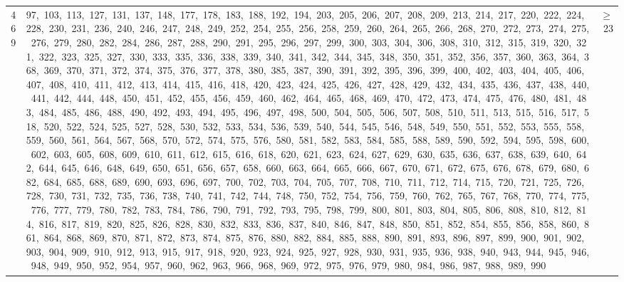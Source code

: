 \begin{longtable}{c|p{}|r}
469 & 97,\ 103,\ 113,\ 127,\ 131,\ 137,\ 148,\ 177,\ 178,\ 183,\ 188,\ 192,\ 194,\ 203,\ 205,\ 206,\ 207,\ 208,\ 209,\ 213,\ 214,\ 217,\ 220,\ 222,\ 224,\ 228,\ 230,\ 231,\ 236,\ 240,\ 246,\ 247,\ 248,\ 249,\ 252,\ 254,\ 255,\ 256,\ 258,\ 259,\ 260,\ 264,\ 265,\ 266,\ 268,\ 270,\ 272,\ 273,\ 274,\ 275,\ 276,\ 279,\ 280,\ 282,\ 284,\ 286,\ 287,\ 288,\ 290,\ 291,\ 295,\ 296,\ 297,\ 299,\ 300,\ 303,\ 304,\ 306,\ 308,\ 310,\ 312,\ 315,\ 319,\ 320,\ 321,\ 322,\ 323,\ 325,\ 327,\ 330,\ 333,\ 335,\ 336,\ 338,\ 339,\ 340,\ 341,\ 342,\ 344,\ 345,\ 348,\ 350,\ 351,\ 352,\ 356,\ 357,\ 360,\ 363,\ 364,\ 368,\ 369,\ 370,\ 371,\ 372,\ 374,\ 375,\ 376,\ 377,\ 378,\ 380,\ 385,\ 387,\ 390,\ 391,\ 392,\ 395,\ 396,\ 399,\ 400,\ 402,\ 403,\ 404,\ 405,\ 406,\ 407,\ 408,\ 410,\ 411,\ 412,\ 413,\ 414,\ 415,\ 416,\ 418,\ 420,\ 423,\ 424,\ 425,\ 426,\ 427,\ 428,\ 429,\ 432,\ 434,\ 435,\ 436,\ 437,\ 438,\ 440,\ 441,\ 442,\ 444,\ 448,\ 450,\ 451,\ 452,\ 455,\ 456,\ 459,\ 460,\ 462,\ 464,\ 465,\ 468,\ 469,\ 470,\ 472,\ 473,\ 474,\ 475,\ 476,\ 480,\ 481,\ 483,\ 484,\ 485,\ 486,\ 488,\ 490,\ 492,\ 493,\ 494,\ 495,\ 496,\ 497,\ 498,\ 500,\ 504,\ 505,\ 506,\ 507,\ 508,\ 510,\ 511,\ 513,\ 515,\ 516,\ 517,\ 518,\ 520,\ 522,\ 524,\ 525,\ 527,\ 528,\ 530,\ 532,\ 533,\ 534,\ 536,\ 539,\ 540,\ 544,\ 545,\ 546,\ 548,\ 549,\ 550,\ 551,\ 552,\ 553,\ 555,\ 558,\ 559,\ 560,\ 561,\ 564,\ 567,\ 568,\ 570,\ 572,\ 574,\ 575,\ 576,\ 580,\ 581,\ 582,\ 583,\ 584,\ 585,\ 588,\ 589,\ 590,\ 592,\ 594,\ 595,\ 598,\ 600,\ 602,\ 603,\ 605,\ 608,\ 609,\ 610,\ 611,\ 612,\ 615,\ 616,\ 618,\ 620,\ 621,\ 623,\ 624,\ 627,\ 629,\ 630,\ 635,\ 636,\ 637,\ 638,\ 639,\ 640,\ 642,\ 644,\ 645,\ 646,\ 648,\ 649,\ 650,\ 651,\ 656,\ 657,\ 658,\ 660,\ 663,\ 664,\ 665,\ 666,\ 667,\ 670,\ 671,\ 672,\ 675,\ 676,\ 678,\ 679,\ 680,\ 682,\ 684,\ 685,\ 688,\ 689,\ 690,\ 693,\ 696,\ 697,\ 700,\ 702,\ 703,\ 704,\ 705,\ 707,\ 708,\ 710,\ 711,\ 712,\ 714,\ 715,\ 720,\ 721,\ 725,\ 726,\ 728,\ 730,\ 731,\ 732,\ 735,\ 736,\ 738,\ 740,\ 741,\ 742,\ 744,\ 748,\ 750,\ 752,\ 754,\ 756,\ 759,\ 760,\ 762,\ 765,\ 767,\ 768,\ 770,\ 774,\ 775,\ 776,\ 777,\ 779,\ 780,\ 782,\ 783,\ 784,\ 786,\ 790,\ 791,\ 792,\ 793,\ 795,\ 798,\ 799,\ 800,\ 801,\ 803,\ 804,\ 805,\ 806,\ 808,\ 810,\ 812,\ 814,\ 816,\ 817,\ 819,\ 820,\ 825,\ 826,\ 828,\ 830,\ 832,\ 833,\ 836,\ 837,\ 840,\ 846,\ 847,\ 848,\ 850,\ 851,\ 852,\ 854,\ 855,\ 856,\ 858,\ 860,\ 861,\ 864,\ 868,\ 869,\ 870,\ 871,\ 872,\ 873,\ 874,\ 875,\ 876,\ 880,\ 882,\ 884,\ 885,\ 888,\ 890,\ 891,\ 893,\ 896,\ 897,\ 899,\ 900,\ 901,\ 902,\ 903,\ 904,\ 909,\ 910,\ 912,\ 913,\ 915,\ 917,\ 918,\ 920,\ 923,\ 924,\ 925,\ 927,\ 928,\ 930,\ 931,\ 935,\ 936,\ 938,\ 940,\ 943,\ 944,\ 945,\ 946,\ 948,\ 949,\ 950,\ 952,\ 954,\ 957,\ 960,\ 962,\ 963,\ 966,\ 968,\ 969,\ 972,\ 975,\ 976,\ 979,\ 980,\ 984,\ 986,\ 987,\ 988,\ 989,\ 990 & $\ge$ 23 \\

\end{longtable}

